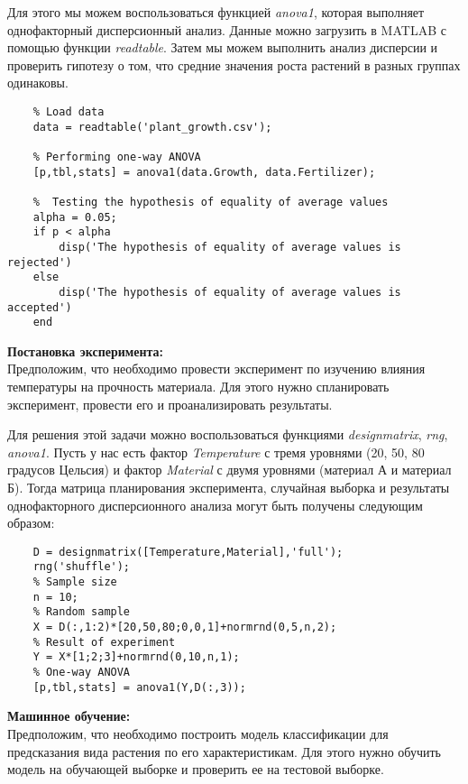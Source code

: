 \documentclass[a4paper, 12pt]{article}%
\begin{document}
\begin{titlepage}
	Для этого мы можем воспользоваться функцией \textit{anova1}, которая выполняет однофакторный дисперсионный анализ. Данные можно загрузить в MATLAB с помощью функции \textit{readtable}. Затем мы можем выполнить анализ дисперсии и проверить гипотезу о том, что средние значения роста растений в разных группах одинаковы.\\
	
	
	\begin{lstlisting}
	% Load data
	data = readtable('plant_growth.csv');
	
	% Performing one-way ANOVA
	[p,tbl,stats] = anova1(data.Growth, data.Fertilizer);
	
	%  Testing the hypothesis of equality of average values
	alpha = 0.05;
	if p < alpha
		disp('The hypothesis of equality of average values is rejected')
	else
		disp('The hypothesis of equality of average values is accepted')
	end
	\end{lstlisting}
	

	
	\textbf{Постановка эксперимента:}\\
	Предположим, что необходимо провести эксперимент по изучению влияния температуры на прочность материала. Для этого нужно спланировать эксперимент, провести его и проанализировать результаты.
	
	Для решения этой задачи можно воспользоваться функциями \textit{designmatrix}, \textit{rng}, \textit{anova1}. Пусть у нас есть фактор \textit{Temperature} с тремя уровнями (20, 50, 80 градусов Цельсия) и фактор \textit{Material} с двумя уровнями (материал А и материал Б). Тогда матрица планирования эксперимента, случайная выборка и результаты однофакторного дисперсионного анализа могут быть получены следующим образом:\\
	
	
	\begin{lstlisting}
	D = designmatrix([Temperature,Material],'full');
	rng('shuffle');
	% Sample size 
	n = 10;
	% Random sample
	X = D(:,1:2)*[20,50,80;0,0,1]+normrnd(0,5,n,2);
	% Result of experiment
	Y = X*[1;2;3]+normrnd(0,10,n,1);
	% One-way ANOVA
	[p,tbl,stats] = anova1(Y,D(:,3));
	\end{lstlisting}
	
	
	\textbf{Машинное обучение:}\\
	Предположим, что необходимо построить модель классификации для предсказания вида растения по его характеристикам. Для этого нужно обучить модель на обучающей выборке и проверить ее на тестовой выборке.
	

\end{titlepage}
\end{document}
